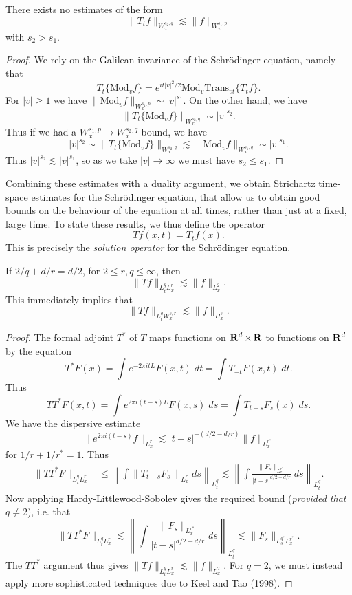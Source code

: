 \begin{lemma}
	There exists no estimates of the form
	\[ \| T_t f \|_{W^{s_2,q}_x} \lesssim \| f \|_{W^{s_1,p}_x} \]
	with $s_2 > s_1$.
\end{lemma}
\begin{proof}
	We rely on the Galilean invariance of the Schr\"{o}dinger equation, namely that
	\[ T_t \{ \text{Mod}_v f \} = e^{i t |v|^2 / 2} \text{Mod}_v \text{Trans}_{vt} \{ T_t f \}. \]
	For $|v| \geq 1$ we have $\| \text{Mod}_v f \|_{W^{s_1,p}_x} \sim |v|^{s_1}$. On the other hand, we have
	\[ \| T_t \{ \text{Mod}_v f \} \|_{W^{s_2,q}_x} \sim |v|^{s_2}. \]
	Thus if we had a $W^{s_1,p}_x \to W^{s_2,q}_x$ bound, we have
	\[ |v|^{s_2} \sim \| T_t \{ \text{Mod}_v f \} \|_{W^{s_2,q}_x} \lesssim \| \text{Mod}_v f \|_{W^{s_1,q}_x} \sim |v|^{s_1}. \]
	Thus $|v|^{s_2} \lesssim |v|^{s_1}$, so as we take $|v| \to \infty$ we must have $s_2 \leq s_1$.
\end{proof}

Combining these estimates with a duality argument, we obtain Strichartz time-space estimates for the Schr\"{o}dinger equation, that allow us to obtain good bounds on the behaviour of the equation at all times, rather than just at a fixed, large time. To state these results, we thus define the operator
%
\[ Tf(x,t) = T_t f(x). \]
%
This is precisely the \emph{solution operator} for the Schr\"{o}dinger equation.

\begin{theorem}
	If $2/q + d/r = d/2$, for $2 \leq r,q \leq \infty$, then
	\[ \| T f \|_{L^q_t L^r_x} \lesssim \| f \|_{L^2_x}. \]
	This immediately implies that
	\[ \| Tf \|_{L^q_t W^{s,r}_x} \lesssim \| f \|_{H^s_x}. \]
\end{theorem}
\begin{proof}
	The formal adjoint $T^*$ of $T$ maps functions on $\operatorname{\mathbf{R}}^d \times \operatorname{\mathbf{R}}$ to functions on $\operatorname{\mathbf{R}}^d$ by the equation
	\[ T^*F(x) = \int e^{-2 \pi i t L} F(x,t)\; dt = \int T_{-t} F(x,t)\; dt. \]
	Thus
	\[ TT^*F(x,t) = \int e^{2 \pi i (t - s) L} F(x,s)\; ds = \int T_{t-s} F_s(x)\; ds. \]
	We have the dispersive estimate
	\[ \| e^{2 \pi i (t - s)} f \|_{L^r_x} \lesssim |t-s|^{- (d/2 - d/r)} \| f \|_{L^{r^*}_x} \]
	for $1/r + 1/r^* = 1$. Thus
	\begin{align*}
		\| TT^* F \|_{L^q_t L^r_x} &\leq \left\| \int \left\| T_{t-s} F_s \right\|_{L^r_x}\; ds \right\|_{L^q_t} \lesssim \left\| \int \frac{\| F_s \|_{L^{r^*}_x}}{|t - s|^{d/2 - d/r}} \; ds \right\|_{L^q_t}.
	\end{align*}
	Now applying Hardy-Littlewood-Sobolev gives the required bound (\emph{provided that $q \neq 2$}), i.e. that
	\[ \| TT^* F \|_{L^q_t L^r_x} \lesssim \left\| \int \frac{\| F_s \|_{L^{r^*}_x}}{|t - s|^{d/2 - d/r}} \; ds \right\|_{L^q_t} \lesssim \| F_s \|_{L^{q^*}_s L^{r^*}_x}. \]
	The $TT^*$ argument thus gives $\| Tf \|_{L^q_t L^r_x} \lesssim \| f \|_{L^2_x}$. For $q = 2$, we must instead apply more sophisticated techniques due to Keel and Tao (1998).
\end{proof}

